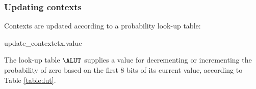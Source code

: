 \subsubsection{Updating contexts}
\label{contextupdate}

Contexts are updated according to a probability look-up table:

\begin{pseudo}{update\_context}{ctx,value}
\bsELSE
\bsEND
\end{pseudo}

The look-up table $\ALUT$ supplies a value for decrementing
or incrementing the probability of zero based on the first 
8 bits of its current value, according to Table \ref{table:lut}.

